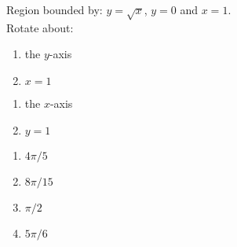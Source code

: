{Region bounded by: $y=\sqrt{x}$, $y=0$ and $x=1$.\\
Rotate about:\\
\begin{minipage}[t]{.5\linewidth}
\begin{enumerate}
\item		the $y$-axis
\item		$x=1$
\end{enumerate}
\end{minipage}%
\begin{minipage}[t]{.5\linewidth}
\begin{enumerate}\addtocounter{enumii}{2}
\item		the $x$-axis
\item		$y=1$
\end{enumerate}
\end{minipage}
}
{\begin{enumerate}
\item $4\pi/5$
\item $8\pi/15$
\item $\pi/2$
\item $5\pi/6$
\end{enumerate}
}
